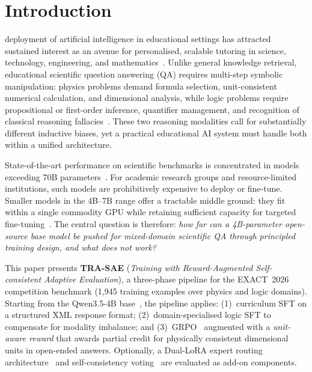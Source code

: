 \documentclass{ieeeaccess}
\newcommand{\modelname}{\textsc{TRA-SAE}}
\newcommand{\basemodelname}{Qwen3.5-4B}
\newcommand{\dataset}{EXACT~2026}
\begin{document}
\section{Introduction}
\label{sec:introduction}

 deployment of artificial intelligence in educational
settings has attracted sustained interest as an avenue for personalised,
scalable tutoring in science, technology, engineering, and
mathematics~\cite{b29}.
Unlike general knowledge retrieval, educational scientific question
answering (QA) requires multi-step symbolic manipulation: physics problems
demand formula selection, unit-consistent numerical calculation, and
dimensional analysis, while logic problems require propositional
or first-order inference, quantifier management, and recognition of
classical reasoning fallacies~\cite{b1,b3}.
These two reasoning modalities call for substantially different inductive
biases, yet a practical educational AI system must handle both within a
unified architecture.

State-of-the-art performance on scientific benchmarks is concentrated in
models exceeding 70B parameters~\cite{b5,b16}.
For academic research groups and resource-limited institutions, such models
are prohibitively expensive to deploy or fine-tune.
Smaller models in the 4B--7B range offer a tractable middle ground:
they fit within a single commodity GPU while retaining sufficient capacity
for targeted fine-tuning~\cite{b7,b18}.
The central question is therefore: \emph{how far can a 4B-parameter
open-source base model be pushed for mixed-domain scientific QA through
principled training design, and what does not work?}

This paper presents \textbf{\modelname{}}
(\emph{Training with Reward-Augmented Self-consistent Adaptive Evaluation}),
a three-phase pipeline for the \dataset{} competition benchmark
(1,945 training examples over physics and logic domains).
Starting from the \basemodelname{} base~\cite{b23}, the pipeline applies:
(1)~curriculum SFT on a structured XML response format;
(2)~domain-specialised logic SFT to compensate for modality imbalance;
and (3)~GRPO~\cite{b4} augmented with a \emph{unit-aware reward} that
awards partial credit for physically consistent dimensional units in
open-ended answers.
Optionally, a Dual-LoRA expert routing architecture~\cite{b19} and
self-consistency voting~\cite{b2} are evaluated as add-on components.
\end{document}
